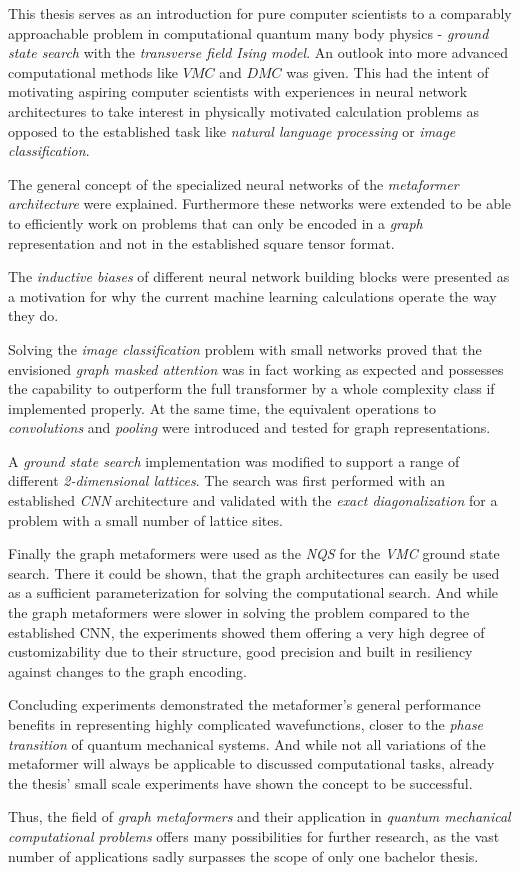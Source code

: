 This thesis serves as an introduction for pure computer scientists to a comparably approachable problem in computational quantum many body physics - \emph{ground state search} with the \emph{transverse field Ising model}.
An outlook into more advanced computational methods like $VMC$ and $DMC$ was given.
This had the intent of motivating aspiring computer scientists with experiences in neural network architectures to take interest in physically motivated calculation problems as opposed to the established task like \emph{natural language processing} or \emph{image classification}.

The general concept of the specialized neural networks of the \emph{metaformer architecture} were explained.
Furthermore these networks were extended to be able to efficiently work on problems that can only be encoded in a \emph{graph} representation and not in the established square tensor format.

The \emph{inductive biases} of different neural network building blocks were presented as a motivation for why the current machine learning calculations operate the way they do.

Solving the \emph{image classification} problem with small networks proved that the envisioned \emph{graph masked attention} was in fact working as expected and possesses the capability to outperform the full transformer by a whole complexity class if implemented properly.
At the same time, the equivalent operations to \emph{convolutions} and \emph{pooling} were introduced and tested for graph representations.

A \emph{ground state search} implementation was modified to support a range of different \emph{2-dimensional lattices}.
The search was first performed with an established \emph{CNN} architecture and validated with the \emph{exact diagonalization} for a problem with a small number of lattice sites.

Finally the graph metaformers were used as the \emph{NQS} for the \emph{VMC} ground state search.
There it could be shown, that the graph architectures can easily be used as a sufficient parameterization for solving the computational search.
And while the graph metaformers were slower in solving the problem compared to the established CNN, the experiments showed them offering a very high degree of customizability due to their structure, good precision and built in resiliency against changes to the graph encoding.

Concluding experiments demonstrated the metaformer's general performance benefits in representing highly complicated wavefunctions, closer to the \emph{phase transition} of quantum mechanical systems.
And while not all variations of the metaformer will always be applicable to discussed computational tasks, already the thesis' small scale experiments have shown the concept to be successful.

Thus, the field of \emph{graph metaformers} and their application in \emph{quantum mechanical computational problems} offers many possibilities for further research, as the vast number of applications sadly surpasses the scope of only one bachelor thesis.
